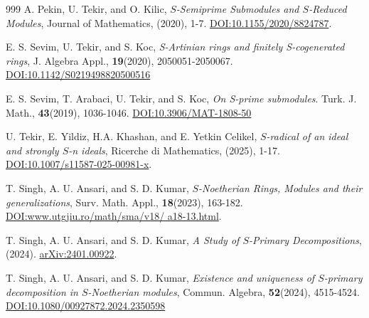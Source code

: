 \documentclass[11pt]{article}
\begin{document}
\begin{thebibliography}{999}
		A. Pekin, U. Tekir, and O. Kilic, \textit{$S$-Semiprime Submodules and $S$-Reduced Modules}, Journal of Mathematics, (2020), 1-7. \href{https://onlinelibrary.wiley.com/doi/10.1155/2020/8824787}{DOI:10.1155/2020/8824787}.
		
		E. S. Sevim, U. Tekir, and S. Koc, \textit{S-Artinian rings and finitely S-cogenerated rings}, J. Algebra Appl.,  \textbf{19}(2020), 2050051-2050067. \href{https://www.worldscientific.com/doi/abs/10.1142/S0219498820500516}{DOI:10.1142/S0219498820500516}
		
		E. S. Sevim, T. Arabaci, U. Tekir, and S. Koc, \textit{On S-prime submodules}. Turk. J. Math., \textbf{43}(2019), 1036-1046. \href{https://doi.org/10.3906/mat-1808-50}{DOI:10.3906/MAT-1808-50}	
        
        U. Tekir, E. Yildiz, H.A. Khashan, and E. Yetkin Celikel,  \textit{$S$-radical of an ideal and strongly $S$-n ideals}, Ricerche di Mathematics, (2025),  1-17. \href{https://link.springer.com/article/10.1007/s11587-025-00981-x}{DOI:10.1007/s11587-025-00981-x}.
        
		T. Singh, A. U. Ansari, and S. D. Kumar, \textit{$S$-Noetherian Rings, Modules and their generalizations}, Surv. Math. Appl.,  \textbf{18}(2023), 163-182. \href{https://www.utgjiu.ro/math/sma/v18/a18_13.html}{DOI:www.utgjiu.ro/math/sma/v18/ a18-13.html}.
		
		T. Singh, A. U. Ansari, and S. D. Kumar, \textit{A Study of $S$-Primary Decompositions}, (2024).	\href{https://arxiv.org/abs/2401.00922}{arXiv:2401.00922}.
		
		T. Singh, A. U. Ansari, and S. D. Kumar, \textit{Existence and uniqueness of $S$-primary decomposition in $S$-Noetherian modules}, Commun. Algebra,  \textbf{52}(2024), 4515-4524. \href{https://www.tandfonline.com/doi/full/10.1080/00927872.2024.2350598}{DOI:10.1080/00927872.2024.2350598}
		
		
		
		

\end{thebibliography}
\end{document}
